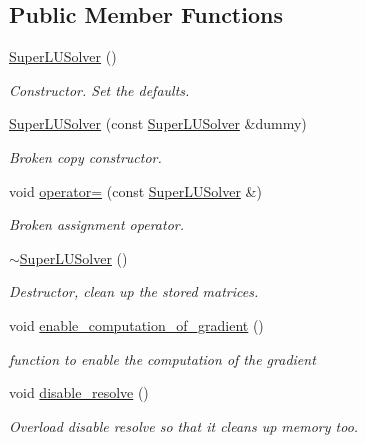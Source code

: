 \subsection*{Public Member Functions}
\begin{DoxyCompactItemize}
\item 
\hyperlink{classoomph_1_1SuperLUSolver_a85a1b2227578d19db7cc5b36094ea07e}{Super\+L\+U\+Solver} ()
\begin{DoxyCompactList}\small\item\em Constructor. Set the defaults. \end{DoxyCompactList}\item 
\hyperlink{classoomph_1_1SuperLUSolver_a863c22b3cb27f57aaeccb46c013ca4ce}{Super\+L\+U\+Solver} (const \hyperlink{classoomph_1_1SuperLUSolver}{Super\+L\+U\+Solver} \&dummy)
\begin{DoxyCompactList}\small\item\em Broken copy constructor. \end{DoxyCompactList}\item 
void \hyperlink{classoomph_1_1SuperLUSolver_adab7beeef8f9eec635b9f07ca423e2bb}{operator=} (const \hyperlink{classoomph_1_1SuperLUSolver}{Super\+L\+U\+Solver} \&)
\begin{DoxyCompactList}\small\item\em Broken assignment operator. \end{DoxyCompactList}\item 
\hyperlink{classoomph_1_1SuperLUSolver_a9ce5a1656ee0ec0d41d367567a990889}{$\sim$\+Super\+L\+U\+Solver} ()
\begin{DoxyCompactList}\small\item\em Destructor, clean up the stored matrices. \end{DoxyCompactList}\item 
void \hyperlink{classoomph_1_1SuperLUSolver_aeb52340bb6d747f60fba9d6c6f9ab2e9}{enable\+\_\+computation\+\_\+of\+\_\+gradient} ()
\begin{DoxyCompactList}\small\item\em function to enable the computation of the gradient \end{DoxyCompactList}\item 
void \hyperlink{classoomph_1_1SuperLUSolver_ac278643faf0a13eb3f8e6bc984338d2a}{disable\+\_\+resolve} ()
\begin{DoxyCompactList}\small\item\em Overload disable resolve so that it cleans up memory too. \end{DoxyCompactList}\item 

\end{DoxyCompactItemize}
